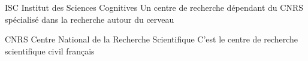   {ISC}
  {Institut des Sciences Cognitives}
  {Un centre de recherche dépendant du \gls{CNRS} spécialisé dans la recherche autour du cerveau}

  {CNRS}
  {Centre National de la Recherche Scientifique}
  {C'est le centre de recherche scientifique civil français}
